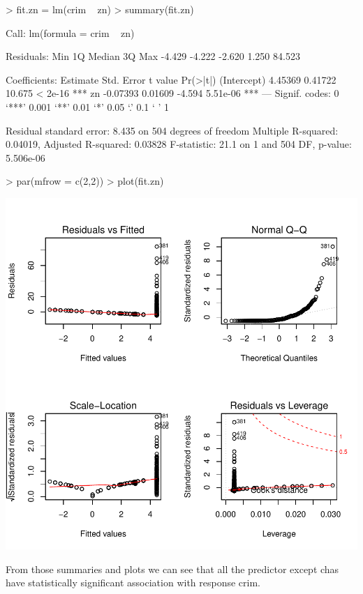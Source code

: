 \documentclass[a4paper]{article}
\begin{document}
\begin{Schunk}
\begin{Sinput}
> fit.zn = lm(crim ~ zn)
> summary(fit.zn)
\end{Sinput}
\begin{Soutput}
Call:
lm(formula = crim ~ zn)

Residuals:
   Min     1Q Median     3Q    Max 
-4.429 -4.222 -2.620  1.250 84.523 

Coefficients:
            Estimate Std. Error t value Pr(>|t|)    
(Intercept)  4.45369    0.41722  10.675  < 2e-16 ***
zn          -0.07393    0.01609  -4.594 5.51e-06 ***
---
Signif. codes:  0 ‘***’ 0.001 ‘**’ 0.01 ‘*’ 0.05 ‘.’ 0.1 ‘ ’ 1

Residual standard error: 8.435 on 504 degrees of freedom
Multiple R-squared:  0.04019,	Adjusted R-squared:  0.03828 
F-statistic:  21.1 on 1 and 504 DF,  p-value: 5.506e-06
\end{Soutput}
\begin{Sinput}
> par(mfrow = c(2,2))
> plot(fit.zn)
\end{Sinput}
\end{Schunk}
\includegraphics{mutivariblelm-zn}
\begin{enumerate}
{\color{red}
\item From those summaries and plots we can see that all the predictor except chas have statistically significant association with response crim.
}
\end{enumerate}
\end{document}

